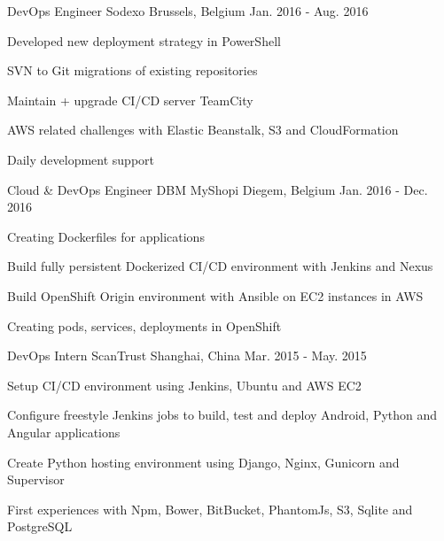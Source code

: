 \begin{cventries}
  \cventry
    {DevOps Engineer} %
    {Sodexo} %
    {Brussels, Belgium} %
    {Jan. 2016 - Aug. 2016} %
    {
      \begin{cvitems} %
        \item {Developed new deployment strategy in PowerShell}
        \item {SVN to Git migrations of existing repositories}
        \item {Maintain + upgrade CI/CD server TeamCity}
        \item {AWS related challenges with Elastic Beanstalk, S3 and CloudFormation}
        \item {Daily development support}
      \end{cvitems}
    }

  \cventry
    {Cloud \& DevOps Engineer} %
    {DBM MyShopi} %
    {Diegem, Belgium} %
    {Jan. 2016 - Dec. 2016} %
    {
      \begin{cvitems} %
        \item {Creating Dockerfiles for applications}
        \item {Build fully persistent Dockerized CI/CD environment with Jenkins and Nexus}
        \item {Build OpenShift Origin environment with Ansible on EC2 instances in AWS}
        \item {Creating pods, services, deployments in OpenShift}
      \end{cvitems}
    }

  \cventry
    {DevOps Intern} %
    {ScanTrust} %
    {Shanghai, China} %
    {Mar. 2015 - May. 2015} %
    {
      \begin{cvitems} %
        \item {Setup CI/CD environment using Jenkins, Ubuntu and AWS EC2}
        \item {Configure freestyle Jenkins jobs to build, test and deploy Android, Python and Angular applications}
        \item {Create Python hosting environment using Django, Nginx, Gunicorn and Supervisor}        
        \item {First experiences with Npm, Bower, BitBucket, PhantomJs, S3, Sqlite and PostgreSQL}
      \end{cvitems}
    }

\end{cventries}